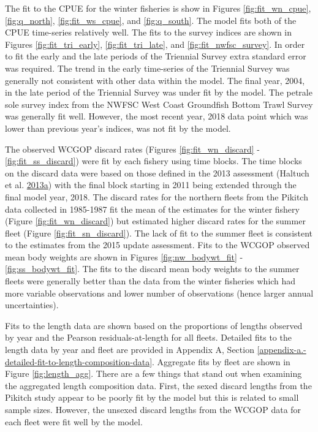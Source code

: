 \documentclass[12pt,]{article}
\begin{document}
The fit to the CPUE for the winter fisheries is show in Figures
\ref{fig:fit_wn_cpue}, \ref{fig:q_north}, \ref{fig:fit_ws_cpue}, and
\ref{fig:q_south}. The model fits both of the CPUE time-series
relatively well. The fits to the survey indices are shown in Figures
\ref{fig:fit_tri_early}, \ref{fig:fit_tri_late}, and
\ref{fig:fit_nwfsc_survey}. In order to fit the early and the late
periods of the Triennial Survey extra standard error was required. The
trend in the early time-series of the Triennial Survey was generally not
consistent with other data within the model. The final year, 2004, in
the late period of the Triennial Survey was under fit by the model. The
petrale sole survey index from the NWFSC West Coast Groundfish Bottom
Trawl Survey was generally fit well. However, the most recent year, 2018
data point which was lower than previous year's indices, was not fit by
the model.

The observed WCGOP discard rates (Figures \ref{fig:fit_wn_discard} -
\ref{fig:fit_ss_discard}) were fit by each fishery using time blocks.
The time blocks on the discard data were based on those defined in the
2013 assessment (Haltuch et al.
\protect\hyperlink{ref-haltuch_california_2013}{2013}\protect\hyperlink{ref-haltuch_california_2013}{a})
with the final block starting in 2011 being extended through the final
model year, 2018. The discard rates for the northern fleets from the
Pikitch data collected in 1985-1987 fit the mean of the estimates for
the winter fishery (Figure \ref{fig:fit_wn_discard}) but estimated
higher discard rates for the summer fleet (Figure
\ref{fig:fit_sn_discard}). The lack of fit to the summer fleet is
consistent to the estimates from the 2015 update assessment. Fits to the
WCGOP observed mean body weights are shown in Figures
\ref{fig:nw_bodywt_fit} - \ref{fig:ss_bodywt_fit}. The fits to the
discard mean body weights to the summer fleets were generally better
than the data from the winter fisheries which had more variable
observations and lower number of observations (hence larger annual
uncertainties).

Fits to the length data are shown based on the proportions of lengths
observed by year and the Pearson residuals-at-length for all fleets.
Detailed fits to the length data by year and fleet are provided in
Appendix A, Section
\ref{appendix-a.-detailed-fit-to-length-composition-data}. Aggregate
fits by fleet are shown in Figure \ref{fig:length_agg}. There are a few
things that stand out when examining the aggregated length composition
data. First, the sexed discard lengths from the Pikitch study appear to
be poorly fit by the model but this is related to small sample sizes.
However, the unsexed discard lengths from the WCGOP data for each fleet
were fit well by the model.
\end{document}
